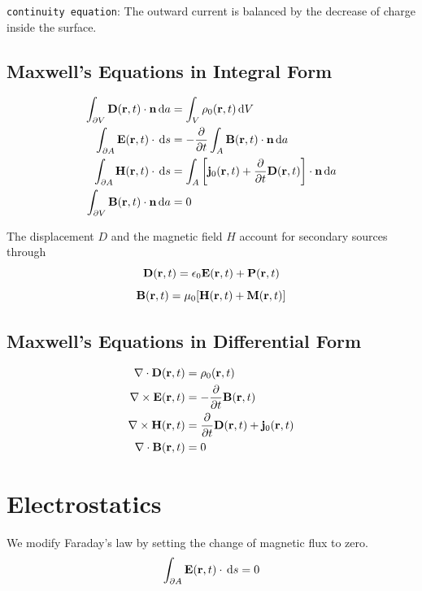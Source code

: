 \documentclass[a4paper, fontsize=8pt, landscape, DIV=1]{scrartcl}
\begin{document}
\begin{multicols*}{4}
  \texttt{continuity equation}: The outward current is balanced by the decrease of charge inside the surface.

  \subsection{Maxwell's Equations in Integral Form}
  \begin{align*}
    \int_{\partial V} \mathbf{D}(\mathbf{r},t) \cdot\mathbf{n}\,\mathrm{d} a &= \int_V \rho_0(\mathbf{r},t) \,\mathrm{d} V \\
    \int_{\partial A} \mathbf{E}(\mathbf{r},t) \cdot \,\mathrm{d} s &= -\frac{\partial}{\partial t}\int_A \mathbf{B}(\mathbf{r},t) \cdot \mathbf{n} \,\mathrm{d} a \\
    \int_{\partial A} \mathbf{H}(\mathbf{r},t) \cdot \,\mathrm{d} s &= \int_A \left[\mathbf{j}_0(\mathbf{r},t) + \frac{\partial}{\partial t}\mathbf{D}(\mathbf{r},t)\right] \cdot \mathbf{n} \,\mathrm{d} a \\
    \int_{\partial V} \mathbf{B}(\mathbf{r},t) \cdot \mathbf{n} \,\mathrm{d} a &= 0
  \end{align*}

  The displacement $D$ and the magnetic field $H$ account for secondary sources through
  \[\mathbf{D}(\mathbf{r},t) = \epsilon_0 \mathbf{E}(\mathbf{r},t)+\mathbf{P}(\mathbf{r},t)\]
  \[ \mathbf{B}(\mathbf{r},t) = \mu_0 [\mathbf{H}(\mathbf{r},t) + \mathbf{M}(\mathbf{r},t)]\]

  \subsection{Maxwell's Equations in Differential Form}
  \begin{align*}
    \nabla \cdot \mathbf{D}(\mathbf{r},t) &= \rho_0(\mathbf{r},t) \\
    \nabla\times \mathbf{E}(\mathbf{r},t) &= -\frac{\partial}{\partial t}\mathbf{B}(\mathbf{r},t) \\
    \nabla\times \mathbf{H}(\mathbf{r},t) &= \frac{\partial}{\partial t}\mathbf{D}(\mathbf{r},t) + \mathbf{j}_0(\mathbf{r},t)\\
    \nabla \cdot \mathbf{B}(\mathbf{r},t) &= 0
  \end{align*}

  \section{Electrostatics}
  We modify Faraday's law by setting the change of magnetic flux to zero. 
  \[\int_{\partial A}\mathbf{E}(\mathbf{r},t)\cdot \,\mathrm{d} s = 0 \]


\end{multicols*}
\end{document}
